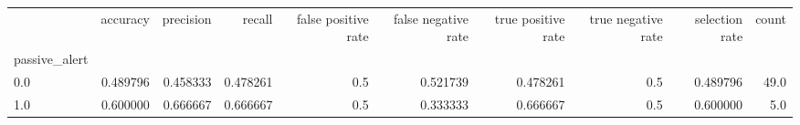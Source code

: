 \begin{tabular}{lrrrrrrrrr}
\toprule
{} &  accuracy &  precision &    recall &  false positive rate &  false negative rate &  true positive rate &  true negative rate &  selection rate &  count \\
passive\_alert &           &            &           &                      &                      &                     &                     &                 &        \\
\midrule
0.0           &  0.489796 &   0.458333 &  0.478261 &                  0.5 &             0.521739 &            0.478261 &                 0.5 &        0.489796 &   49.0 \\
1.0           &  0.600000 &   0.666667 &  0.666667 &                  0.5 &             0.333333 &            0.666667 &                 0.5 &        0.600000 &    5.0 \\
\bottomrule
\end{tabular}
